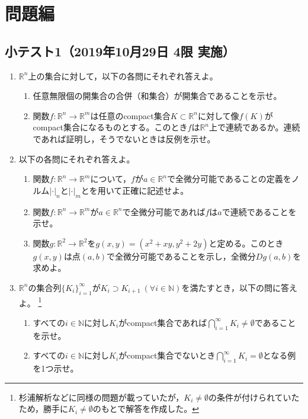 \documentclass[dvipdfmx,a4j,10pt]{jsarticle}
\theoremstyle{mystyle1}
\theoremstyle{mystyle2}
\begin{document}
\section{問題編}

\subsection{小テスト1（2019年10月29日 4限 実施）}

\begin{enumerate}
    \item $\mathbb{R}^n$上の集合に対して，以下の各問にそれぞれ答えよ。
        \begin{enumerate}\renewcommand{\labelenumii}{(\arabic{enumii})}
            \item 任意無限個の開集合の合併（和集合）が開集合であることを示せ。
            \item 関数$f:\mathbb{R}^n\to\mathbb{R}^m$は任意のcompact集合$K\subset\mathbb{R}^n$に対して像$f(K)$がcompact集合になるものとする。このとき$f$は$\mathbb{R}^n$上で連続であるか。連続であれば証明し，そうでないときは反例を示せ。
        \end{enumerate}
    \item 以下の各問にそれぞれ答えよ。
        \begin{enumerate}\renewcommand{\labelenumii}{(\arabic{enumii})}
            \item 関数$f:\mathbb{R}^n\to\mathbb{R}^m$について，$f$が$a\in\mathbb{R}^n$で全微分可能であることの定義をノルム$|\cdot|_n$と$|\cdot|_m$とを用いて正確に記述せよ。
            \item 関数$f:\mathbb{R}^n\to\mathbb{R}^m$が$a\in\mathbb{R}^n$で全微分可能であれば$f$は$a$で連続であることを示せ。
            \item 関数$g:\mathbb{R}^2\to\mathbb{R}^2$を$g(x,y)=(x^2+xy,y^2+2y)$と定める。このとき$g(x,y)$は点$(a,b)$で全微分可能であることを示し，全微分$Dg(a,b)$を求めよ。
        \end{enumerate}
    \item $\mathbb{R}^n$の集合列$\{K_i\}_{i=1}^\infty$が$K_i\supset K_{i+1}\ (\forall i\in\mathbb{N})$を満たすとき，以下の問に答えよ。
    \footnote{杉浦解析などに同様の問題が載っていたが，$K_i\neq\emptyset$の条件が付けられていたため，勝手に$K_i\neq\emptyset$のもとで解答を作成した。}
        \begin{enumerate}\renewcommand{\labelenumii}{(\arabic{enumii})}
            \item すべての$i\in\mathbb{N}$に対し$K_i$がcompact集合であれば$\displaystyle\bigcap_{i=1}^\infty K_i\neq\emptyset$であることを示せ。
            \item すべての$i\in\mathbb{N}$に対し$K_i$がcompact集合でないとき$\displaystyle\bigcap_{i=1}^\infty K_i=\emptyset$となる例を1つ示せ。
        \end{enumerate}
\end{enumerate}
\end{document}
